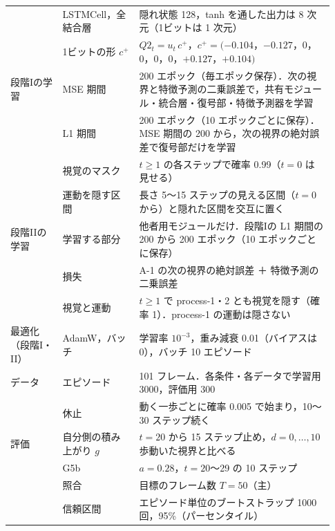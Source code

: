 \begin{tabular}{@{}p{0.15\linewidth}p{0.22\linewidth}p{0.56\linewidth}@{}}
 & LSTMCell，全結合層 & 隠れ状態 128，tanh を通した出力は 8 次元（1ビットは 1 次元） \\
 & 1ビットの形 $c^{+}$ & $Q2_t=u_t\,c^{+}$，$c^{+}=(-0.104$，$-0.127$，0，0，0，0，$+0.127$，$+0.104)$ \\
\midrule
段階Iの学習 & MSE 期間 & 200 エポック（毎エポック保存）．次の視界と特徴予測の二乗誤差で，共有モジュール・統合層・復号部・特徴予測器を学習 \\
 & L1 期間 & 200 エポック（10 エポックごとに保存）．MSE 期間の 200 から，次の視界の絶対誤差で復号部だけを学習 \\
 & 視覚のマスク & $t\ge1$ の各ステップで確率 0.99（$t=0$ は見せる） \\
 & 運動を隠す区間 & 長さ 5〜15 ステップの見える区間（$t=0$ から）と隠れた区間を交互に置く \\
\midrule
段階IIの学習 & 学習する部分 & 他者用モジュールだけ．段階Iの L1 期間の 200 から 200 エポック（10 エポックごとに保存） \\
 & 損失 & A-1 の次の視界の絶対誤差 ＋ 特徴予測の二乗誤差 \\
 & 視覚と運動 & $t\ge1$ で process-1・2 とも視覚を隠す（確率 1）．process-1 の運動は隠さない \\
\midrule
最適化（段階I・II） & AdamW，バッチ & 学習率 $10^{-3}$，重み減衰 0.01（バイアスは0），バッチ 10 エピソード \\
\midrule
データ & エピソード & 101 フレーム．各条件・各データで学習用 3000，評価用 300 \\
 & 休止 & 動く一歩ごとに確率 0.005 で始まり，10〜30 ステップ続く \\
\midrule
評価 & 自分側の積み上がり $g$ & $t=20$ から 15 ステップ止め，$d=0,\dots,10$ 歩動いた視界と比べる \\
 & G5b & $a=0.28$，$t=20$〜29 の 10 ステップ \\
 & 照合 & 目標のフレーム数 $T=50$（主） \\
 & 信頼区間 & エピソード単位のブートストラップ 1000 回，95\%（パーセンタイル） \\
\bottomrule
\end{tabular}
